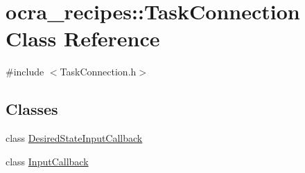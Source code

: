 \hypertarget{classocra__recipes_1_1TaskConnection}{}\section{ocra\+\_\+recipes\+:\+:Task\+Connection Class Reference}
\label{classocra__recipes_1_1TaskConnection}


{\ttfamily \#include $<$Task\+Connection.\+h$>$}

\subsection*{Classes}
\begin{DoxyCompactItemize}
\item 
class \hyperlink{classocra__recipes_1_1TaskConnection_1_1DesiredStateInputCallback}{Desired\+State\+Input\+Callback}
\item 
class \hyperlink{classocra__recipes_1_1TaskConnection_1_1InputCallback}{Input\+Callback}
\end{DoxyCompactItemize}
